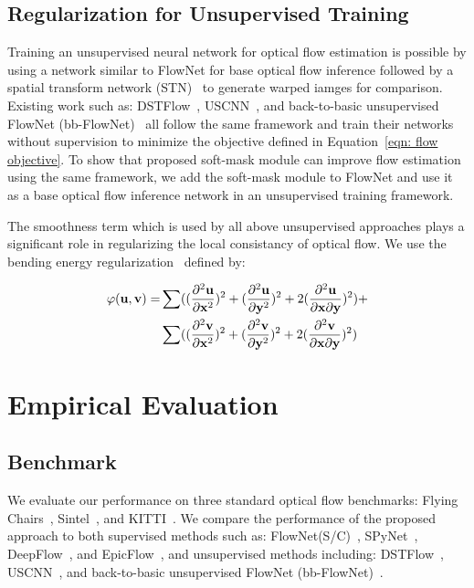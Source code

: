 \documentclass[10pt,twocolumn,letterpaper]{article}
\begin{document}
\subsection{Regularization for Unsupervised Training}
Training an unsupervised neural network for optical flow estimation is possible by using a network similar to FlowNet for base optical flow inference followed by a spatial transform network (STN)~\cite{jaderberg2015spatial} to generate warped iamges for comparison. Existing work such as: DSTFlow~\cite{ren2017unsupervised}, USCNN~\cite{ahmadi2016unsupervised}, and back-to-basic unsupervised FlowNet (bb-FlowNet)~\cite{DBLP:journals/corr/YuHD16} all follow the same framework and train their networks without supervision to minimize the objective defined in Equation~\ref{eqn: flow objective}.  To show that proposed soft-mask module can improve flow estimation using the same framework, we add the soft-mask module to FlowNet and use it as a base optical flow inference network in an unsupervised training framework.

The smoothness term which is used by all above unsupervised approaches plays a significant role in regularizing the local consistancy of optical flow. We use the bending energy regularization~\cite{rohlfing2003volume}\cite{ashburner1999nonlinear} defined by:

\begin{align*}
\varphi(\bold{u}, \bold{v}) = & \sum ((\frac{\partial^2\bold{u}}{\partial \bold{x}^2})^2+(\frac{\partial^2\bold{u}}{\partial \bold{y}^2})^2+2(\frac{\partial^2\bold{u}}{\partial \bold{x} \partial \bold{y}})^2) + \\ 
& \sum ((\frac{\partial^2\bold{v}}{\partial \bold{x}^2})^2+(\frac{\partial^2\bold{v}}{\partial \bold{y}^2})^2+2(\frac{\partial^2\bold{v}}{\partial \bold{x} \partial \bold{y}})^2)
\end{align*}


\section{Empirical Evaluation}
\label{sec: evaluation}
\subsection{Benchmark}
We evaluate our performance on three standard optical flow benchmarks: Flying Chairs~\cite{7410673},  Sintel~\cite{Butler:ECCV:2012}, and KITTI~\cite{geiger2012we}. We compare the performance of the proposed approach to both supervised methods such as: FlowNet(S/C)~\cite{7410673}, SPyNet~\cite{Ranjan_2017_CVPR}, DeepFlow~\cite{weinzaepfel2013deepflow}, and EpicFlow~\cite{revaud2015epicflow}, and  unsupervised methods including: DSTFlow~\cite{ren2017unsupervised}, USCNN~\cite{ahmadi2016unsupervised}, and back-to-basic unsupervised FlowNet (bb-FlowNet)~\cite{DBLP:journals/corr/YuHD16}. 
\end{document}
